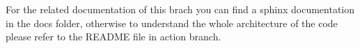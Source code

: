 For the related documentation of this brach you can find a sphinx documentation in the docs folder, otherwise to understand the whole architecture of the code please refer to the R\+E\+A\+D\+ME file in \textquotesingle{}action\textquotesingle{} branch. 